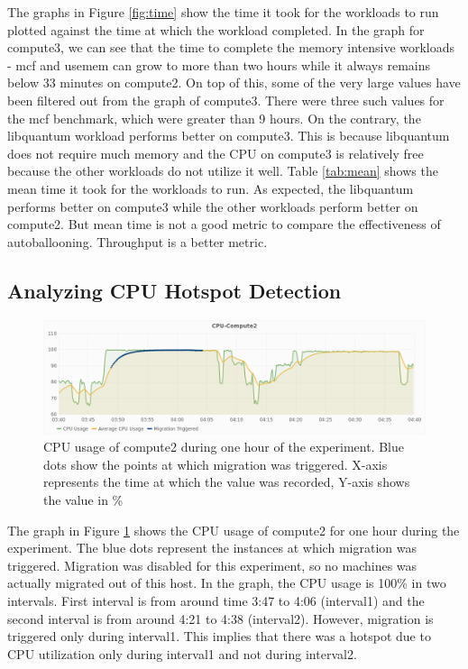 The graphs in Figure \ref{fig:time} show the time it took for the workloads to run plotted against the time at which the workload completed. In the graph for compute3, we can see that the time to complete the memory intensive workloads - mcf and usemem can grow to more than two hours while it always remains below 33 minutes on compute2. On top of this, some of the very large values have been filtered out from the graph of compute3. There were three such values for the mcf benchmark, which were greater than 9 hours. On the contrary, the libquantum workload performs better on compute3. This is because libquantum does not require much memory and the CPU on compute3 is relatively free because the other workloads do not utilize it well.
Table \ref{tab:mean} shows the mean time it took for the workloads to run. As expected, the libquantum performs better on compute3 while the other workloads perform better on compute2. But mean time is not a good metric to compare the effectiveness of autoballooning. Throughput is a better metric.

\subsection{Analyzing CPU Hotspot Detection}

\begin{figure}
  \centering
  \includegraphics[width=\textwidth]{cpu-migration.png}
  \caption{CPU usage of compute2 during one hour of the experiment. Blue dots show the points at which migration was triggered. X-axis represents the time at which the value was recorded, Y-axis shows the value in \%}\label{fig:cpu-mig}
\end{figure}

The graph in Figure \ref{fig:cpu-mig} shows the CPU usage of compute2 for one hour during the experiment. The blue dots represent the instances at which migration was triggered. Migration was disabled for this experiment, so no machines was actually migrated out of this host. In the graph, the CPU usage is 100\% in two intervals. First interval is from around time 3:47 to 4:06 (interval1) and the second interval is from around 4:21 to 4:38 (interval2). However, migration is triggered only during interval1. This implies that there was a hotspot due to CPU utilization only during interval1 and not during interval2.

